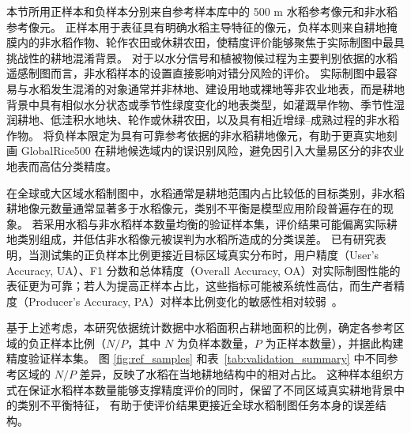 本节所用正样本和负样本分别来自参考样本库中的 500 m 水稻参考像元和非水稻参考像元。
正样本用于表征具有明确水稻主导特征的像元，负样本则来自耕地掩膜内的非水稻作物、轮作农田或休耕农田，使精度评价能够聚焦于实际制图中最具挑战性的耕地混淆背景。
对于以水分信号和植被物候过程为主要判别依据的水稻遥感制图而言，非水稻样本的设置直接影响对错分风险的评价。
实际制图中最容易与水稻发生混淆的对象通常并非林地、建设用地或裸地等非农业地表，而是耕地背景中具有相似水分状态或季节性绿度变化的地表类型，如灌溉旱作物、季节性湿润耕地、低洼积水地块、轮作或休耕农田，以及具有相近增绿--成熟过程的非水稻作物。
将负样本限定为具有可靠参考依据的非水稻耕地像元，有助于更真实地刻画 GlobalRice500 在耕地候选域内的误识别风险，避免因引入大量易区分的非农业地表而高估分类精度。

在全球或大区域水稻制图中，水稻通常是耕地范围内占比较低的目标类别，非水稻耕地像元数量通常显著多于水稻像元，类别不平衡是模型应用阶段普遍存在的现象。
若采用水稻与非水稻样本数量均衡的验证样本集，评价结果可能偏离实际耕地类别组成，并低估非水稻像元被误判为水稻所造成的分类误差。
已有研究表明，当测试集的正负样本比例更接近目标区域真实分布时，用户精度（User's Accuracy, UA）、F1 分数和总体精度（Overall Accuracy, OA）对实际制图性能的表征更为可靠；若人为提高正样本占比，这些指标可能被系统性高估，而生产者精度（Producer's Accuracy, PA）对样本比例变化的敏感性相对较弱~\cite{Xiao2024JAG}。

基于上述考虑，本研究依据统计数据中水稻面积占耕地面积的比例，确定各参考区域的负正样本比例（$N/P$，其中 $N$ 为负样本数量，$P$ 为正样本数量），并据此构建精度验证样本集。
图 \ref{fig:ref_samples} 和表~\ref{tab:validation_summary} 中不同参考区域的 $N/P$ 差异，反映了水稻在当地耕地结构中的相对占比。
这种样本组织方式在保证水稻样本数量能够支撑精度评价的同时，保留了不同区域真实耕地背景中的类别不平衡特征，
有助于使评价结果更接近全球水稻制图任务本身的误差结构。

